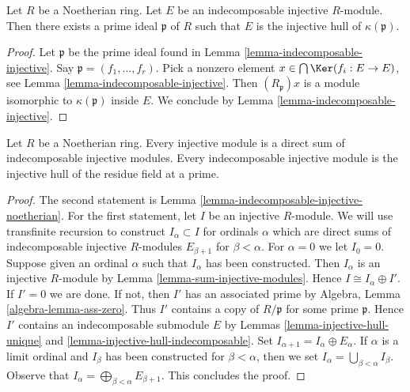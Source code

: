 \begin{lemma}
\label{lemma-indecomposable-injective-noetherian}
Let $R$ be a Noetherian ring. Let $E$ be an indecomposable injective
$R$-module. Then there exists a prime ideal $\mathfrak p$ of $R$ such that
$E$ is the injective hull of $\kappa(\mathfrak p)$.
\end{lemma}

\begin{proof}
Let $\mathfrak p$ be the prime ideal found in
Lemma \ref{lemma-indecomposable-injective}.
Say $\mathfrak p = (f_1, \ldots, f_r)$.
Pick a nonzero element $x \in \bigcap \Ker(f_i : E \to E)$,
see Lemma \ref{lemma-indecomposable-injective}.
Then $(R_\mathfrak p)x$ is a module isomorphic to $\kappa(\mathfrak p)$
inside $E$. We conclude by Lemma \ref{lemma-indecomposable-injective}.
\end{proof}

\begin{proposition}
\label{proposition-structure-injectives-noetherian}
Let $R$ be a Noetherian ring.
Every injective module is a direct sum of indecomposable injective modules.
Every indecomposable injective module is the injective hull of
the residue field at a prime.
\end{proposition}

\begin{proof}
The second statement is Lemma \ref{lemma-indecomposable-injective-noetherian}.
For the first statement, let $I$ be an injective $R$-module.
We will use transfinite recursion to construct $I_\alpha \subset I$
for ordinals $\alpha$ which are direct sums of indecomposable injective
$R$-modules $E_{\beta + 1}$ for $\beta < \alpha$.
For $\alpha = 0$ we let $I_0 = 0$. Suppose given an ordinal $\alpha$
such that $I_\alpha$ has been constructed. Then $I_\alpha$ is an
injective $R$-module by Lemma \ref{lemma-sum-injective-modules}.
Hence $I \cong I_\alpha \oplus I'$. If $I' = 0$ we are done.
If not, then $I'$ has an associated prime by
Algebra, Lemma \ref{algebra-lemma-ass-zero}.
Thus $I'$ contains a copy of $R/\mathfrak p$ for some prime $\mathfrak p$.
Hence $I'$ contains an indecomposable submodule $E$ by
Lemmas \ref{lemma-injective-hull-unique} and
\ref{lemma-injective-hull-indecomposable}. Set
$I_{\alpha + 1} = I_\alpha \oplus E_\alpha$.
If $\alpha$ is a limit ordinal and $I_\beta$ has been constructed
for $\beta < \alpha$, then we set
$I_\alpha = \bigcup_{\beta < \alpha} I_\beta$.
Observe that $I_\alpha = \bigoplus_{\beta < \alpha} E_{\beta + 1}$.
This concludes the proof.
\end{proof}




